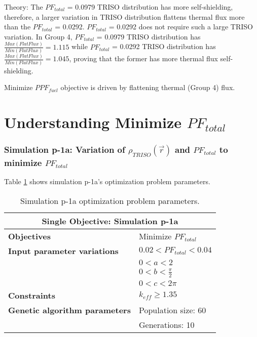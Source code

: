 Theory: The $PF_{total}$ = 0.0979 TRISO distribution has more self-shielding, therefore, 
a larger variation in TRISO distribution flattens thermal flux more than the 
$PF_{total}$ = 0.0292. 
$PF_{total}$ = 0.0292 does not require such a large TRISO variation. 
In Group 4, $PF_{total}$ = 0.0979 TRISO distribution has 
$\frac{Max(Flat Flux)}{Min(Flat Flux)} = 1.115$ while $PF_{total}$ = 0.0292 TRISO 
distribution has $\frac{Max(Flat Flux)}{Min(Flat Flux)} = 1.045$, proving that the 
former has more thermal flux self-shielding. 

Minimize $PPF_{fuel}$ objective is driven by flattening thermal (Group 4) flux.

\pagebreak
\section{Understanding Minimize $PF_{total}$}

\subsubsection{Simulation p-1a: Variation of $\rho_{TRISO}(\vec{r})$ and $PF_{total}$ 
to minimize $PF_{total}$}
Table \ref{tab:simulationp1a} shows simulation p-1a's optimization problem parameters. 
\begin{table}[htbp!]
    \centering
    \onehalfspacing
    \caption{Simulation p-1a optimization problem parameters.}
	\label{tab:simulationp1a}
    \footnotesize
    \begin{tabular}{l|p{5cm}}
    \hline 
    \multicolumn{2}{c}{\textbf{Single Objective: Simulation p-1a}} \\
    \hline 
    \textbf{Objectives} & Minimize $PF_{total}$ \\
    \hline 
    \textbf{Input parameter variations} & $0.02<PF_{total}<0.04$ \\
    & $0<a<2$ \\
    & $0<b<\frac{\pi}{2}$ \\
    & $0<c<2\pi$ \\
    \hline
    \textbf{Constraints} & $k_{eff} \geq 1.35$\\ 
    \hline 
    \textbf{Genetic algorithm parameters} & Population size: 60 \\
    & Generations: 10 \\
    \hline
    \end{tabular}
\end{table}

